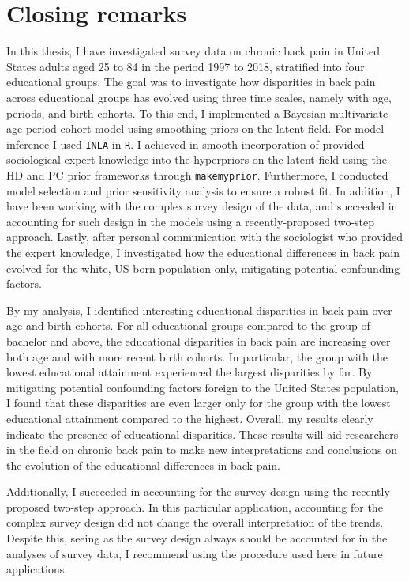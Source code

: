 \section{Closing remarks}
\label{section:application2:conclusion}
In this thesis, I have investigated survey data on chronic back pain in United States adults aged 25 to 84 in the period 1997 to 2018, stratified into four educational groups. The goal was to investigate how disparities in back pain across educational groups has evolved using three time scales, namely with age, periods, and birth cohorts. To this end, I implemented a Bayesian multivariate age-period-cohort model using smoothing priors on the latent field. For model inference I used \texttt{INLA} in \texttt{R}. I achieved in smooth incorporation of provided sociological expert knowledge into the hyperpriors on the latent field using the HD and PC prior frameworks through \texttt{makemyprior}. Furthermore, I conducted model selection and prior sensitivity analysis to ensure a robust fit. In addition, I have been working with the complex survey design of the data, and succeeded in accounting for such design in the models using a recently-proposed two-step approach. Lastly, after personal communication with the sociologist who provided the expert knowledge, I investigated how the educational differences in back pain evolved for the white, US-born population only, mitigating potential confounding factors.

By my analysis, I identified interesting educational disparities in back pain over age and birth cohorts. For all educational groups compared to the group of bachelor and above, the educational disparities in back pain are increasing over both age and with more recent birth cohorts. In particular, the group with the lowest educational attainment experienced the largest disparities by far. By mitigating potential confounding factors foreign to the United States population, I found that these disparities are even larger only for the group with the lowest educational attainment compared to the highest. Overall, my results clearly indicate the presence of educational disparities. These results will aid researchers in the field on chronic back pain to make new interpretations and conclusions on the evolution of the educational differences in back pain. 

Additionally, I succeeded in accounting for the survey design using the recently-proposed two-step approach. In this particular application, accounting for the complex survey design did not change the overall interpretation of the trends. Despite this, seeing as the survey design always should be accounted for in the analyses of survey data, I recommend using the procedure used here in future applications. 

